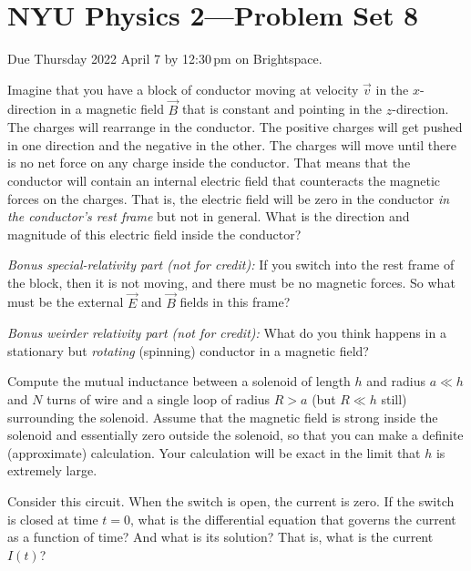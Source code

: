\documentclass[12pt]{article}
\begin{document}
\section*{NYU Physics 2---Problem Set 8}

Due Thursday 2022 April 7 by 12:30\,pm on Brightspace.

\startproblem%
Imagine that you have a block of conductor moving at velocity
$\vec{v}$ in the $x$-direction in a magnetic field $\vec{B}$ that is
constant and pointing in the $z$-direction. The charges will rearrange
in the conductor. The positive charges will get pushed in one
direction and the negative in the other.
The charges will move until there is no net force on any
charge inside the conductor.
That means that the conductor will
contain an internal electric field that counteracts the magnetic
forces on the charges.
That is, the electric field will be zero in the conductor \emph{in the conductor's rest frame} but not in general.
What is the direction and magnitude of this
electric field inside the conductor?

\textsl{Bonus special-relativity part (not for credit):} If you switch
into the rest frame of the block, then it is not moving, and there
must be no magnetic forces. So what must be the external $\vec{E}$ and
$\vec{B}$ fields in this frame?

\textsl{Bonus weirder relativity part (not for credit):} What do you
think happens in a stationary but \emph{rotating} (spinning) conductor in a magnetic
field?

\startproblem%
Compute the mutual
inductance between a solenoid of length $h$ and radius $a\ll h$ and
$N$ turns of wire and a single loop of radius $R>a$ (but $R\ll h$
still) surrounding the solenoid. Assume that the magnetic field is
strong inside the solenoid and essentially zero outside the solenoid,
so that you can make a definite (approximate) calculation. Your
calculation will be exact in the limit that $h$ is extremely large.

\startproblem%
Consider this circuit.
When the switch is open, the current is zero. If the switch is closed
at time $t=0$, what is the differential equation that governs the
current as a function of time? And what is its solution? That is,
what is the current $I(t)$?
\end{document}
